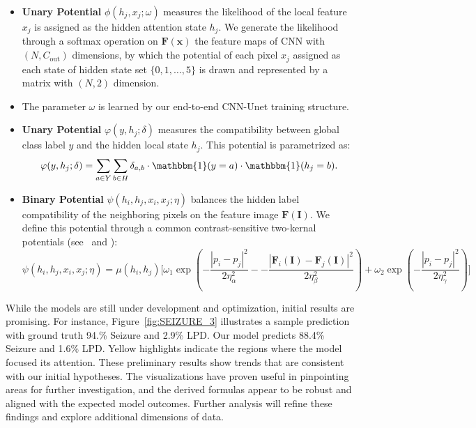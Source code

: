 \documentclass[10pt]{article}
\newcommand{\Fb}{\mathbf{F}}
\newcommand{\Ib}{\mathbf{I}}
\newcommand{\xb}{\mathbf{x}}
\newcommand{\one}{\mathbbm{1}}
\begin{document}
\begin{itemize}
\item \textbf{Unary Potential} $\phi(h_j, x_j; \omega)$ measures
the likelihood of the local feature $x_j$ is assigned as
the hidden attention state $h_j$.
We generate the likelihood through a softmax operation on $\Fb(\xb)$
the feature maps of CNN with $(N, C_{\textrm{out}})$ dimensions,
by which the potential of each pixel $x_j$ assigned as each state of
hidden state set $\{0, 1, \dots, 5\}$
is drawn and represented by a matrix with $(N, 2)$ dimension.
\item The parameter $\omega$ is learned by our end-to-end CNN-Unet training 
structure.
\item \textbf{Unary Potential} $\varphi(y, h_j; \delta)$ measures
the compatibility between global class label $y$ and the hidden local
state $h_j$. This potential is parametrized as:
\begin{align*}
\varphi(y, h_{j}; \delta) = \sum_{a \in Y} \sum_{b \in H} \delta_{a, b}
\cdot \one(y = a) \cdot \one(h_j = b).
\end{align*}
\item \textbf{Binary Potential} $\psi(h_i, h_j, x_i, x_j; \eta)$
balances the hidden label compatibility of the neighboring pixels on the 
feature image $\Fb(\Ib)$.
We define this potential through a common contrast-sensitive two-kernal 
potentials (see~\citet{krahenbuhl2011efficient} and \citet{chen2022end}):
\begin{equation*}
\psi(h_i, h_j, x_i, x_j; \eta) = \mu(h_i, h_j) \Bigg[
\omega_1 \exp \left(
-\frac{\left\lvert p_i - p_j \right\rvert^2}{2\eta_\alpha^2}-
-\frac{\left\lvert \Fb_i(\Ib) - \Fb_j(\Ib) \right\rvert^2}{2\eta_\beta^2} 
\right) + \omega_2 \exp \left(
- \frac{\left\lvert p_i - p_j \right\rvert^2}{2 \eta_\gamma^2}
\right)
\Bigg]
\end{equation*}
\end{itemize}


While the models are still under development and optimization,
initial results are promising. For instance, Figure~\ref{fig:SEIZURE_3}
illustrates a sample prediction with ground truth 94.\% Seizure and 2.9\% LPD.
Our model predicts 88.4\% Seizure and 1.6\% LPD.
Yellow highlights indicate the regions where the model focused its attention.
These preliminary results show trends that are consistent with our initial
hypotheses. The visualizations have proven useful in pinpointing areas for
further investigation, and the derived formulas appear to be robust and
aligned with the expected model outcomes. Further analysis will refine
these findings and explore additional dimensions of data.
\end{document}
